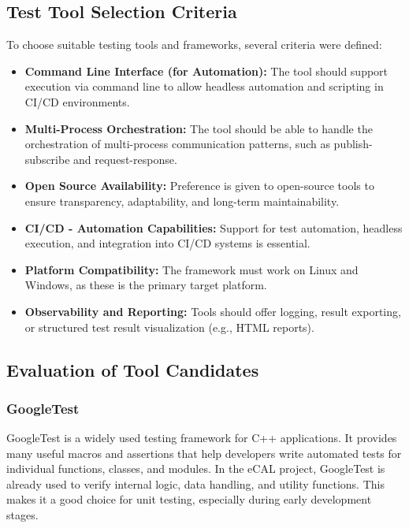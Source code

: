\subsection{Test Tool Selection Criteria}

To choose suitable testing tools and frameworks, several criteria were defined:

\begin{itemize}
	\item \textbf{Command Line Interface (for Automation):} The tool should support execution via command line to allow headless automation and scripting in CI/CD environments.
	\item \textbf{Multi-Process Orchestration:} The tool should be able to handle the orchestration of multi-process communication patterns, such as publish-subscribe and request-response.
	\item \textbf{Open Source Availability:} Preference is given to open-source tools to ensure transparency, adaptability, and long-term maintainability.
	\item \textbf{CI/CD - Automation Capabilities:} Support for test automation, headless execution, and integration into CI/CD systems is essential.
	\item \textbf{Platform Compatibility:} The framework must work on Linux and Windows, as these is the primary target platform.
	\item \textbf{Observability and Reporting:} Tools should offer logging, result exporting, or structured test result visualization (e.g., HTML reports).

\end{itemize}

\subsection{Evaluation of Tool Candidates}

\subsubsection*{GoogleTest}

GoogleTest is a widely used testing framework for C++ applications. It provides many useful macros and assertions that help developers write automated tests for individual functions, classes, and modules. In the eCAL project, GoogleTest is already used to verify internal logic, data handling, and utility functions. This makes it a good choice for unit testing, especially during early development stages.

